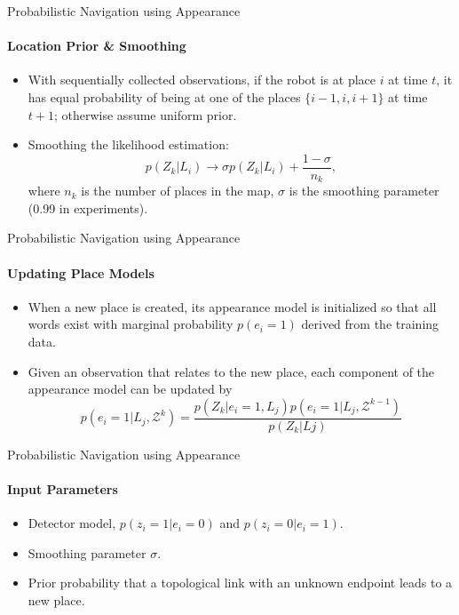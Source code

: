 \documentclass[dvipsnames, handout]{beamer}
\newcommand{\1}{\mathds{1}}	%
\begin{document}
\begin{frame}[t]{Probabilistic Navigation using Appearance}
\framesubtitle{Location Prior \& Smoothing}
\begin{itemize}
\item With sequentially collected observations, if the robot is at place $i$ at time $t$, it has equal probability of being at one of the places $\{i-1, i, i+1\}$ at time $t+1$; otherwise assume uniform prior.
\item Smoothing the likelihood estimation:
\[p(Z_k|L_i) \rightarrow \sigma p(Z_k|L_i) + \frac{1-\sigma}{n_k}, \]
where $n_k$ is the number of places in the map, $\sigma$ is the smoothing parameter (0.99 in experiments).
\end{itemize}
\end{frame}


\begin{frame}[t]{Probabilistic Navigation using Appearance}
\framesubtitle{Updating Place Models}
\begin{itemize}
\item When a new place is created, its appearance model is initialized so that all words exist with marginal probability $p(e_i=1)$ derived from the training data.
\item Given an observation that relates to the new place, each component of the appearance model can be updated by
\[p(e_i=1|L_j,\mathcal{Z}^k) = \frac{p(Z_k|e_i=1,L_j)p(e_i=1|L_j, \mathcal{Z}^{k-1})}{p(Z_k|Lj)}\]
\end{itemize}

\end{frame}


\begin{frame}[t]{Probabilistic Navigation using Appearance}
\framesubtitle{Input Parameters}
\begin{itemize}
\item Detector model, $p(z_i=1|e_i=0)$ and $p(z_i=0|e_i=1)$.
\item Smoothing parameter $\sigma$.
\item Prior probability that a topological link with an unknown endpoint leads to a new place.
\end{itemize}

\end{frame}
\end{document}
